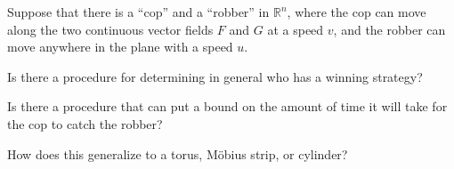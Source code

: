 \documentclass{article}
\begin{document}
  Suppose that there is a ``cop'' and a ``robber'' in $\mathbb{R}^n$, where the
  cop can move along the two continuous vector fields $F$ and $G$ at a speed
  $v$, and the robber can move anywhere in the plane with a speed $u$.
\begin{question}
  Is there a procedure for determining in general who has a winning strategy?
\end{question}
\begin{related}
  \item Is there a procedure that can put a bound on the amount of time it will
    take for the cop to catch the robber?
  \item How does this generalize to a torus, M\"obius strip, or cylinder?
\end{related}
\end{document}
